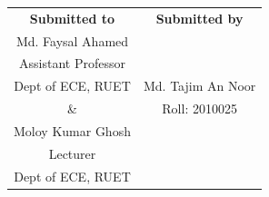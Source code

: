 \begin{center}
    \begin{tabular}{c|c}
        \textbf{Submitted to} & \textbf{Submitted by} \\
        Md. Faysal Ahamed     &                       \\
        Assistant Professor   &                       \\
        Dept of ECE, RUET     & Md. Tajim An Noor     \\
        \&                    & Roll: 2010025         \\
        Moloy Kumar Ghosh     &                       \\
        Lecturer              &                       \\
        Dept of ECE, RUET     &                       \\
    \end{tabular}

\end{center}
\vspace*{\fill}
